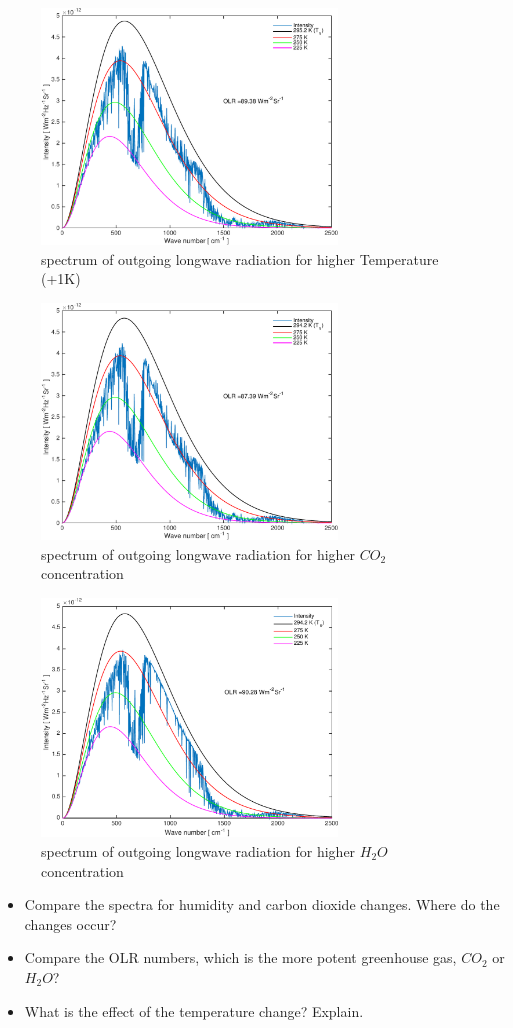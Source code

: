 \documentclass[paper=a4, fontsize=11pt]{scrartcl} %
\begin{document}
\begin{figure}[h]
\centering
	\includegraphics[width=0.7\textwidth]{plots/olr_+T.pdf}
	\caption{spectrum of outgoing longwave radiation for higher Temperature (+1K)}
\end{figure}

\begin{figure}[h]
\centering
	\includegraphics[width=0.7\textwidth]{plots/olr_+CO2.pdf}
	\caption{spectrum of outgoing longwave radiation for higher $CO_{2}$ concentration}
\end{figure}

\begin{figure}[h]
\centering
	\includegraphics[width=0.7\textwidth]{plots/olr_+H2O.pdf}
	\caption{spectrum of outgoing longwave radiation for higher $H_{2}O$ concentration}
\end{figure}

\begin{itemize}
	\item Compare the spectra for humidity and carbon dioxide changes. Where do the changes occur?
	\item Compare the OLR numbers, which is the more potent greenhouse gas, $CO_{2}$ or $H_{2}O$?
	\item What is the effect of the temperature change? Explain.
\end{itemize}
\end{document}
